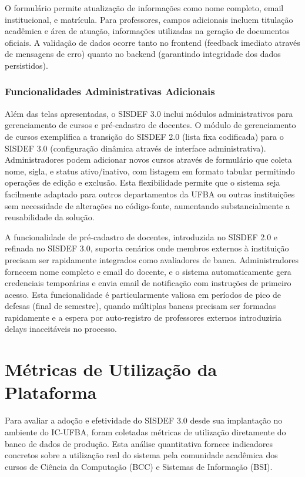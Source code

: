 \documentclass[nonacm, sigconf]{acmart}
\begin{document}
O formulário permite atualização de informações como nome completo, email institucional, e matrícula. Para professores, campos adicionais incluem titulação acadêmica e área de atuação, informações utilizadas na geração de documentos oficiais. A validação de dados ocorre tanto no frontend (feedback imediato através de mensagens de erro) quanto no backend (garantindo integridade dos dados persistidos).

\subsubsection{Funcionalidades Administrativas Adicionais}

Além das telas apresentadas, o SISDEF 3.0 inclui módulos administrativos para gerenciamento de cursos e pré-cadastro de docentes. O módulo de gerenciamento de cursos exemplifica a transição do SISDEF 2.0 (lista fixa codificada) para o SISDEF 3.0 (configuração dinâmica através de interface administrativa). Administradores podem adicionar novos cursos através de formulário que coleta nome, sigla, e status ativo/inativo, com listagem em formato tabular permitindo operações de edição e exclusão. Esta flexibilidade permite que o sistema seja facilmente adaptado para outros departamentos da UFBA ou outras instituições sem necessidade de alterações no código-fonte, aumentando substancialmente a reusabilidade da solução.

A funcionalidade de pré-cadastro de docentes, introduzida no SISDEF 2.0 e refinada no SISDEF 3.0, suporta cenários onde membros externos à instituição precisam ser rapidamente integrados como avaliadores de banca. Administradores fornecem nome completo e email do docente, e o sistema automaticamente gera credenciais temporárias e envia email de notificação com instruções de primeiro acesso. Esta funcionalidade é particularmente valiosa em períodos de pico de defesas (final de semestre), quando múltiplas bancas precisam ser formadas rapidamente e a espera por auto-registro de professores externos introduziria delays inaceitáveis no processo.


\section{Métricas de Utilização da Plataforma}
\label{section:results}

Para avaliar a adoção e efetividade do SISDEF 3.0 desde sua implantação no ambiente do IC-UFBA, foram coletadas métricas de utilização diretamente do banco de dados de produção. Esta análise quantitativa fornece indicadores concretos sobre a utilização real do sistema pela comunidade acadêmica dos cursos de Ciência da Computação (BCC) e Sistemas de Informação (BSI).
\end{document}
